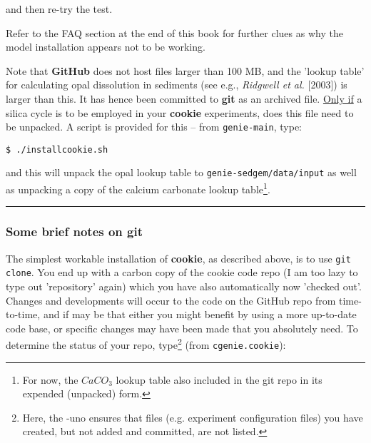 \noindent and then re-try the test. 

\vspace{1mm}
Refer to the FAQ section at the end of this book for further clues as why the model installation appears not to be working.

\newpage

\noindent Note that \textbf{GitHub} does not host files larger than 100 MB, and the 'lookup table' for calculating opal dissolution in sediments (see e.g., \textit{Ridgwell et al.} [2003]) is larger than this. It has hence been committed to \textbf{git} as an archived file. \uline{Only if} a silica cycle is to be employed in your \textbf{cookie} experiments, does this file need to be unpacked. A script is provided for this -- from \texttt{genie-main}, type:

\vspace{-2mm}
\begin{verbatim}
$ ./installcookie.sh
\end{verbatim}
\vspace{-2mm}

\noindent and this will unpack the opal lookup table to \texttt{genie-sedgem/data/input} as well as unpacking a copy of the calcium carbonate lookup table\footnote{For now, the \(CaCO_{3}\) lookup table also included in the git repo in its expended (unpacked) form.}.

\vspace{1mm}\noindent\rule{4cm}{0.5pt}\vspace{2mm}

\subsubsection*{Some brief notes on git}

The simplest workable installation of \textbf{cookie}, as described above, is to use \texttt{git clone}. You end up with a carbon copy of the cookie code repo (I am too lazy to type out 'repository' again) which you have also automatically now 'checked out'. Changes and developments will occur to the code on the GitHub repo from time-to-time, and if may be that either you might benefit by using a more up-to-date code base, or specific changes may have been made that you absolutely need. To determine the status of your repo, type\footnote{Here, the -uno ensures that files (e.g. experiment configuration files) you have created, but not added and committed, are not listed.} (from \texttt{cgenie.cookie}):

